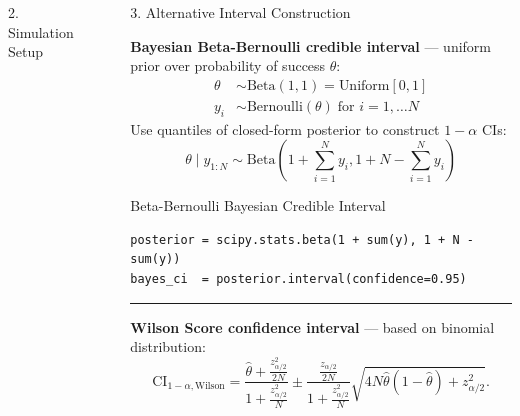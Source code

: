 \documentclass[final]{beamer}
\newlength{\sepwidth}
\newlength{\colwidth}
\newcommand{\separatorcolumn}{\begin{column}{\sepwidth}\end{column}}
\begin{document}
\begin{frame}[fragile]
\begin{columns}[t]
\begin{column}{\colwidth}
\begin{exampleblock}{2. Simulation Setup}



  \end{exampleblock}

\end{column}

\separatorcolumn

\begin{column}{\colwidth}

  \begin{block}{3. Alternative Interval Construction}

    \textbf{Bayesian Beta-Bernoulli credible interval} --- uniform prior over probability of success $\theta$:
    $$
    \begin{aligned}
      \theta &\sim \text{Beta}(1, 1) = \text{Uniform}[0, 1] \\
      y_i &\sim \text{Bernoulli}(\theta) \; \text{for } i=1,\dots N 
    \end{aligned}
    $$
    Use quantiles of closed-form posterior to construct $1-\alpha$ CIs:
    $$
    \theta \mid y_{1:N} \sim \text{Beta}\left(1 + \sum_{i=1}^N y_i, 1 + N - \sum_{i=1}^N y_i\right)
    $$

    \begin{pbox}[label={ex:bayes_simple}]{Beta-Bernoulli Bayesian Credible Interval}
    \begin{verbatim}
posterior = scipy.stats.beta(1 + sum(y), 1 + N - sum(y))
bayes_ci  = posterior.interval(confidence=0.95)
    \end{verbatim}
    \end{pbox}

    \vspace{-1.25em}
    \begin{center}
      \rule{0.8\textwidth}{0.4pt}
    \end{center}

    \textbf{Wilson Score confidence interval} --- based on binomial distribution:
    $$
    \text{CI}_{1-\alpha, \text{Wilson}} = \frac{\hat{\theta} + \frac{z_{\alpha/2}^2}{2N}}{1 + \frac{z_{\alpha/2}^2}{N}} \pm \frac{\frac{z_{\alpha/2}}{2N}}{1 + \frac{z_{\alpha/2}^2}{N}}\sqrt{4N\hat{\theta}(1 - \hat{\theta}) + z_{\alpha/2}^2}.
    $$


\end{block}
\end{column}
\end{columns}
\end{frame}
\end{document}
